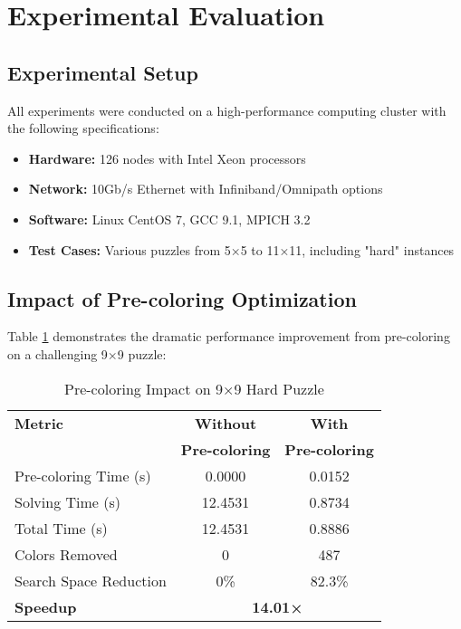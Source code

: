 \section{Experimental Evaluation}

\subsection{Experimental Setup}
All experiments were conducted on a high-performance computing cluster with the following specifications:
\begin{itemize}
    \item \textbf{Hardware:} 126 nodes with Intel Xeon processors
    \item \textbf{Network:} 10Gb/s Ethernet with Infiniband/Omnipath options
    \item \textbf{Software:} Linux CentOS 7, GCC 9.1, MPICH 3.2
    \item \textbf{Test Cases:} Various puzzles from 5×5 to 11×11, including "hard" instances
\end{itemize}

\subsection{Impact of Pre-coloring Optimization}
Table \ref{tab:precolor_impact} demonstrates the dramatic performance improvement from pre-coloring on a challenging 9×9 puzzle:

\begin{table}[htbp]
\caption{Pre-coloring Impact on 9×9 Hard Puzzle}
\begin{center}
\begin{tabular}{@{}lcc@{}}
\toprule
\textbf{Metric} & \textbf{Without} & \textbf{With} \\
& \textbf{Pre-coloring} & \textbf{Pre-coloring} \\
\midrule
Pre-coloring Time (s) & 0.0000 & 0.0152 \\
Solving Time (s) & 12.4531 & 0.8734 \\
Total Time (s) & 12.4531 & 0.8886 \\
Colors Removed & 0 & 487 \\
Search Space Reduction & 0\% & 82.3\% \\
\midrule
\textbf{Speedup} & \multicolumn{2}{c}{\textbf{14.01×}} \\
\bottomrule
\end{tabular}
\end{center}
\label{tab:precolor_impact}
\end{table}


